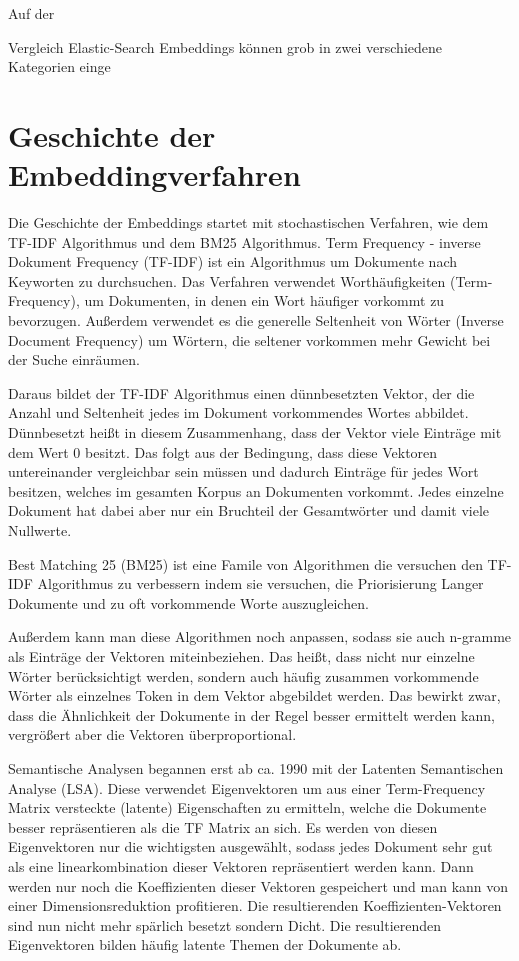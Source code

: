 Auf der 

Vergleich Elastic-Search
Embeddings können grob in zwei verschiedene Kategorien einge

\section{Geschichte der Embeddingverfahren}

Die Geschichte der Embeddings startet mit stochastischen Verfahren, wie dem TF-IDF Algorithmus und dem BM25 Algorithmus. 
Term Frequency - inverse Dokument Frequency (TF-IDF) ist ein Algorithmus um Dokumente nach Keyworten zu durchsuchen.
Das Verfahren verwendet Worthäufigkeiten (Term-Frequency), um Dokumenten, in denen ein Wort häufiger vorkommt zu bevorzugen.
Außerdem verwendet es die generelle Seltenheit von Wörter (Inverse Document Frequency) um Wörtern, die seltener vorkommen mehr Gewicht bei der Suche einräumen.

Daraus bildet der TF-IDF Algorithmus einen dünnbesetzten Vektor, der die Anzahl und Seltenheit jedes im Dokument vorkommendes Wortes abbildet. 
Dünnbesetzt heißt in diesem Zusammenhang, dass der Vektor viele Einträge mit dem Wert 0 besitzt. 
Das folgt aus der Bedingung, dass diese Vektoren untereinander vergleichbar sein müssen und dadurch Einträge für jedes Wort besitzen, welches im gesamten Korpus an Dokumenten vorkommt.
Jedes einzelne Dokument hat dabei aber nur ein Bruchteil der Gesamtwörter und damit viele Nullwerte.

Best Matching 25 (BM25) ist eine Famile von Algorithmen die versuchen den TF-IDF Algorithmus zu verbessern indem sie versuchen, die Priorisierung Langer Dokumente und zu oft vorkommende Worte auszugleichen.

Außerdem kann man diese Algorithmen noch anpassen, sodass sie auch n-gramme als Einträge der Vektoren miteinbeziehen. 
Das heißt, dass nicht nur einzelne Wörter berücksichtigt werden, sondern auch häufig zusammen vorkommende Wörter als einzelnes Token in dem Vektor abgebildet werden. 
Das bewirkt zwar, dass die Ähnlichkeit der Dokumente in der Regel besser ermittelt werden kann, vergrößert aber die Vektoren überproportional.

Semantische Analysen begannen erst ab ca. 1990 mit der Latenten Semantischen Analyse (LSA).
Diese verwendet Eigenvektoren um aus einer Term-Frequency Matrix versteckte (latente) Eigenschaften zu ermitteln, welche die Dokumente besser repräsentieren als die TF Matrix an sich. 
Es werden von diesen Eigenvektoren nur die wichtigsten ausgewählt, sodass jedes Dokument sehr gut als eine linearkombination dieser Vektoren repräsentiert werden kann.
Dann werden nur noch die Koeffizienten dieser Vektoren gespeichert und man kann von einer Dimensionsreduktion profitieren.
Die resultierenden Koeffizienten-Vektoren sind nun nicht mehr spärlich besetzt sondern Dicht.
Die resultierenden Eigenvektoren bilden häufig latente Themen der Dokumente ab.

